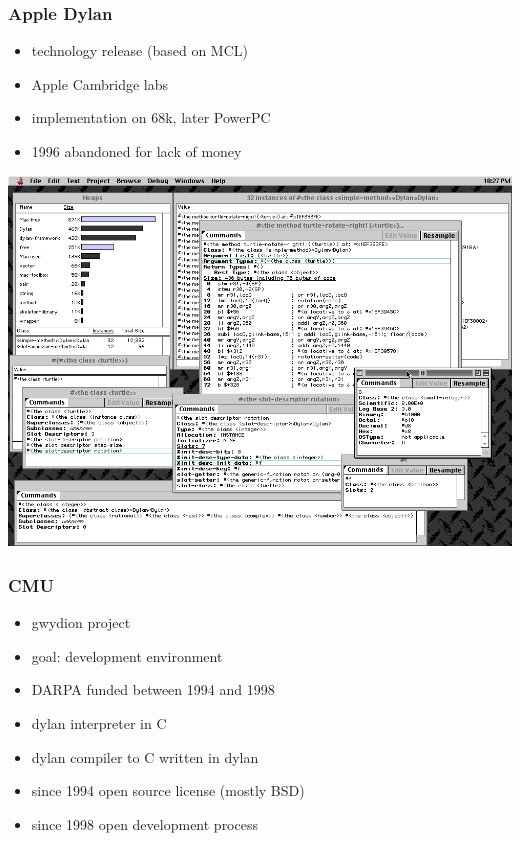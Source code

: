 \documentclass[compress]{beamer}
\begin{document}
\begin{frame}
  \frametitle{Apple Dylan}
  \begin{itemize}
  \item technology release (based on MCL)
  \item Apple Cambridge labs
  \item implementation on 68k, later PowerPC
  \item 1996 abandoned for lack of money
  \end{itemize}
\end{frame}

\begin{frame}
  \includegraphics [height=\textheight, width=\textwidth]{appledylan-debugging-grab-bag.png}
\end{frame}

\begin{frame}
  \frametitle{CMU}
  \begin{itemize}
  \item gwydion project
  \item goal: development environment
  \item DARPA funded between 1994 and 1998
  \item dylan interpreter in C
  \item dylan compiler to C written in dylan
  \item since 1994 open source license (mostly BSD)
  \item since 1998 open development process
  \end{itemize}
\end{frame}
\end{document}
